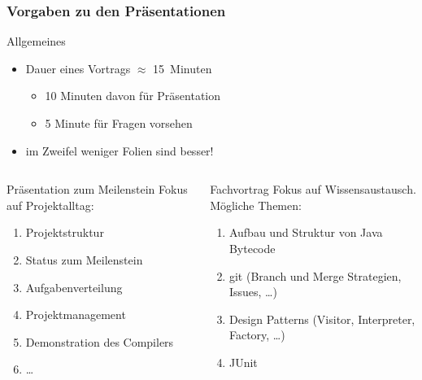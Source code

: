 \documentclass[ucs,9pt]{beamer}
\begin{document}
\begin{frame}
    \frametitle{Vorgaben zu den Präsentationen}
    \begin{block}{Allgemeines}
        \begin{itemize}
            \item Dauer eines Vortrags $\approx$ 15~Minuten
                \begin{itemize}
                    \item 10 Minuten davon für Präsentation
                    \item 5 Minute für Fragen vorsehen
                \end{itemize}
            \item im Zweifel weniger Folien sind besser!
        \end{itemize}
    \end{block}
    \begin{columns}
        \begin{column}{0.5\textwidth}
            \begin{block}{Präsentation zum Meilenstein}
               Fokus auf Projektalltag:
               \begin{enumerate}
                   \item Projektstruktur
                   \item Status zum Meilenstein
                   \item Aufgabenverteilung
                   \item Projektmanagement
                   \item Demonstration des Compilers
                   \item \dots
               \end{enumerate}
            \end{block}
        \end{column}
        \begin{column}{0.5\textwidth}
            \begin{block}{Fachvortrag}
               Fokus auf Wissensaustausch. Mögliche Themen:
               \begin{enumerate}
                   \item Aufbau und Struktur von Java Bytecode
                   \item git (Branch und Merge Strategien, Issues, \dots)
                   \item Design Patterns (Visitor, Interpreter,
                       Factory, \dots)
                   \item JUnit
               \end{enumerate}
            \end{block}
        \end{column}
    \end{columns}
\end{frame}
\end{document}

